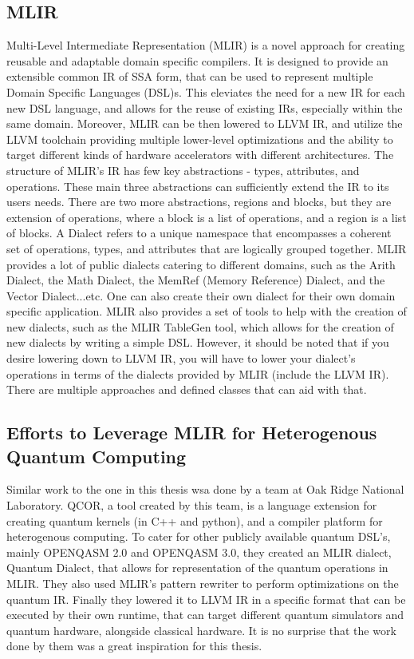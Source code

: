 \subsection{MLIR}
Multi-Level Intermediate Representation (MLIR) is a novel approach for creating
reusable and adaptable domain specific compilers. It is designed to provide an
extensible common IR of SSA form, that can be used to represent multiple Domain
Specific Languages (DSL)s. This eleviates the need for a new IR for each new DSL
language, and allows for the reuse of existing IRs, especially within the same
domain. Moreover, MLIR can be then lowered to LLVM IR, and utilize the LLVM
toolchain providing multiple lower-level optimizations and the ability to target
different kinds of hardware accelerators with different architectures. The
structure of MLIR's IR has few key abstractions - types, attributes, and
operations. These main three abstractions can sufficiently extend the IR to its
users needs. There are two more abstractions, regions and blocks, but they are
extension of operations, where a block is a list of operations, and a region is
a list of blocks. A Dialect refers to a unique namespace that encompasses a
coherent set of operations, types, and attributes that are logically grouped
together. MLIR provides a lot of public dialects catering to different domains,
such as the Arith Dialect, the Math Dialect, the MemRef (Memory Reference) Dialect,
and the Vector Dialect...etc. One can also create their own dialect 
for their own domain specific application. MLIR also provides a set of tools to
help with the creation of new dialects, such as the MLIR TableGen tool, which
allows for the creation of new dialects by writing a simple DSL.
However, it should be noted that if you desire lowering down to LLVM IR, you 
will have to lower your dialect's operations in terms of the dialects provided 
by MLIR (include the LLVM IR). There are multiple approaches and defined classes that can aid with that.
\subsection{Efforts to Leverage MLIR for Heterogenous Quantum Computing}
Similar work to the one in this thesis wsa done by a team at Oak Ridge National Laboratory.
QCOR, a tool created by this team, is a language extension for creating quantum kernels (in C++ and python),
and a compiler platform for heterogenous computing.
To cater for other publicly available quantum DSL's, mainly OPENQASM 2.0 and OPENQASM 3.0, they created an 
MLIR dialect, Quantum Dialect, that allows for representation of the quantum operations in MLIR.
They also used MLIR's pattern rewriter to perform optimizations on the quantum IR.
Finally they lowered it to LLVM IR in a specific format that can be executed by their own runtime, 
that can target different quantum simulators and quantum hardware, alongside classical hardware.
It is no surprise that the work done by them was a great inspiration for this thesis.